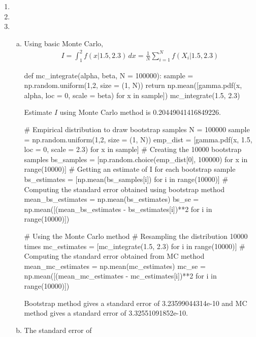 \documentclass[a4paper,10pt]{article}
\theoremstyle{definition}
\begin{document}
\begin{enumerate}
\item

\item

\item
\begin{enumerate}[(a)]
\item Using basic Monte Carlo,
\begin{align*}
I = \int_{1}^{2}f(x|1.5,2.3) \,dx= \frac{1}{N}\sum_{i=1}^{N}f(X_i|1.5,2.3)
\end{align*}
\begin{python}
def mc_integrate(alpha, beta, N = 100000):
    sample = np.random.uniform(1,2, size = (1, N))
    return np.mean([gamma.pdf(x, alpha, loc = 0, scale = beta) for x in sample])   
mc_integrate(1.5, 2.3)    
\end{python}
Estimate $I$ using Monte Carlo method is 0.20449041416849226.
\begin{python}
# Empirical distribution to draw bootstrap samples
N = 100000
sample = np.random.uniform(1,2, size = (1, N))
emp_dist = [gamma.pdf(x, 1.5, loc = 0, scale = 2.3) for x in sample]
# Creating the 10000 bootstrap samples
bs_samples = [np.random.choice(emp_dist[0], 100000) for x in range(10000)]
# Getting an estimate of I for each bootstrap sample
bs_estimates = [np.mean(bs_samples[i]) for i in range(10000)]
# Computing the standard error obtained using bootstrap method
mean_bs_estimates = np.mean(bs_estimates)
bs_se = np.mean([(mean_bs_estimates - bs_estimates[i])**2 for i in range(10000)])

# Using the Monte Carlo method
# Resampling the distribution 10000 times 
mc_estimates = [mc_integrate(1.5, 2.3) for i in range(10000)]
# Computing the standard error obtained from MC method
mean_mc_estimates = np.mean(mc_estimates)
mc_se = np.mean([(mean_mc_estimates - mc_estimates[i])**2 for i in range(10000)])
\end{python}
Bootstrap method gives a standard error of 3.23599044314e-10 and MC method gives a standard error of 3.32551091852e-10.
\item The standard error of 
\end{enumerate}
\end{enumerate}
\end{document}
